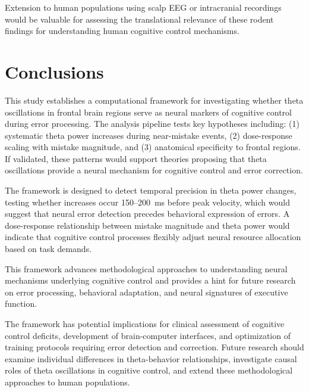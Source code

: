\documentclass[11pt]{article}
\begin{document}
Extension to human populations using scalp EEG or intracranial recordings would be valuable for assessing the translational relevance of these rodent findings for understanding human cognitive control mechanisms.

\section{Conclusions}

This study establishes a computational framework for investigating whether theta oscillations in frontal brain regions serve as neural markers of cognitive control during error processing. The analysis pipeline tests key hypotheses including: (1) systematic theta power increases during near-mistake events, (2) dose-response scaling with mistake magnitude, and (3) anatomical specificity to frontal regions. If validated, these patterns would support theories proposing that theta oscillations provide a neural mechanism for cognitive control and error correction.

The framework is designed to detect temporal precision in theta power changes, testing whether increases occur 150--200~ms before peak velocity, which would suggest that neural error detection precedes behavioral expression of errors. A dose-response relationship between mistake magnitude and theta power would indicate that cognitive control processes flexibly adjust neural resource allocation based on task demands.

This framework advances methodological approaches to understanding neural mechanisms underlying cognitive control and provides a hint for future research on error processing, behavioral adaptation, and neural signatures of executive function. 

The framework has potential implications for clinical assessment of cognitive control deficits, development of brain-computer interfaces, and optimization of training protocols requiring error detection and correction. Future research should examine individual differences in theta-behavior relationships, investigate causal roles of theta oscillations in cognitive control, and extend these methodological approaches to human populations.
\end{document}
